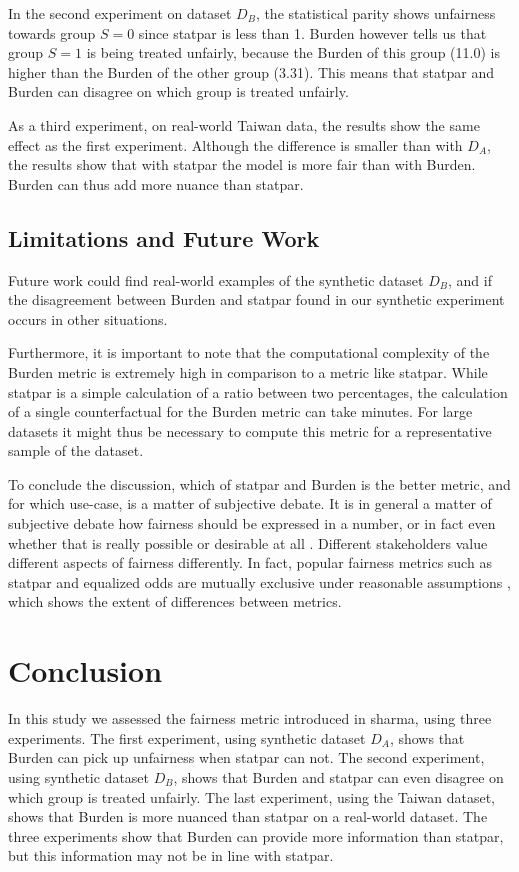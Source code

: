 \documentclass[runningheads]{llncs}
\begin{document}
In the second experiment on dataset $D_B$, the statistical parity shows unfairness towards group $S=0$ since \gls{statpar} is less than 1. Burden however tells us that group $S=1$ is being treated unfairly, because the Burden of this group (11.0) is higher than the Burden of the other group (3.31). This means that \gls{statpar} and Burden can disagree on which group is treated unfairly.

As a third experiment, on real-world Taiwan data, the results show the same effect as the first experiment. Although the difference is smaller than with $D_A$, the results show that with \gls{statpar} the model is more fair than with Burden. Burden can thus add more nuance than \gls{statpar}.

\subsection{Limitations and Future Work}
Future work could find real-world examples of the synthetic dataset $D_B$, and if the disagreement between \gls{Burden} and \gls{statpar} found in our synthetic experiment occurs in other situations.

Furthermore, it is important to note that the computational complexity of the \gls{Burden} metric is extremely high in comparison to a metric like \gls{statpar}. While \gls{statpar} is a simple calculation of a ratio between two percentages, the calculation of a single counterfactual for the \gls{Burden} metric can take minutes. For large datasets it might thus be necessary to compute this metric for a representative sample of the dataset.

To conclude the discussion, which of \gls{statpar} and \gls{Burden} is the better metric, and for which use-case, is a matter of subjective debate. It is in general a matter of subjective debate how fairness should be expressed in a number, or in fact even whether that is really possible or desirable at all \cite{corbett2018measure}. Different stakeholders value different aspects of fairness differently. In fact, popular fairness metrics such as \gls{statpar} and equalized odds \cite{hardt2016equality} are mutually exclusive under reasonable assumptions \cite{chouldechova2017fair}, which shows the extent of differences between metrics.

\section{Conclusion}\label{sec:conclusion}
In this study we assessed the fairness metric introduced in \gls{sharma}, using three experiments.
The first experiment, using synthetic dataset $D_A$, shows that \gls{Burden} can pick up unfairness when \gls{statpar} can not. The second experiment, using synthetic dataset $D_B$, shows that \gls{Burden} and \gls{statpar} can even disagree on which group is treated unfairly. The last experiment, using the Taiwan dataset, shows that \gls{Burden} is more nuanced than \gls{statpar} on a real-world dataset. The three experiments show that \gls{Burden} can provide more information than \gls{statpar}, but this information may not be in line with \gls{statpar}.
\end{document}
